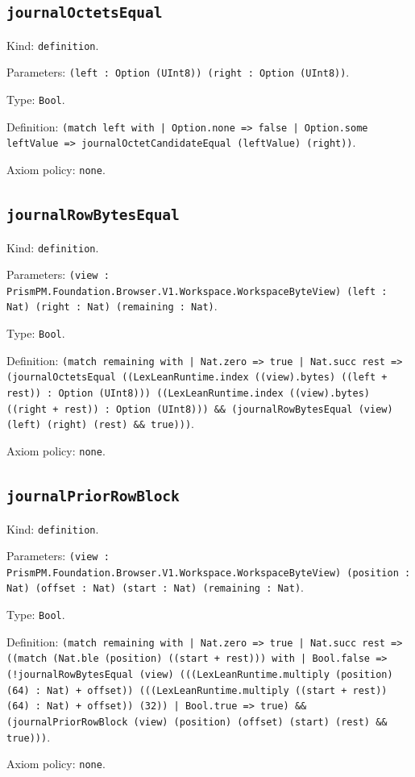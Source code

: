 \documentclass[11pt]{article}
\begin{document}
\subsection*{\texttt{journalOctetsEqual}}
\noindent Kind: \texttt{definition}.\par
\noindent Parameters: \texttt{(left : Option (UInt8)) (right : Option (UInt8))}.\par
\noindent Type: \texttt{Bool}.\par
\noindent Definition: \texttt{(match left with | Option.none => false | Option.some leftValue => journalOctetCandidateEqual (leftValue) (right))}.\par
\noindent Axiom policy: \texttt{none}.\par
\subsection*{\texttt{journalRowBytesEqual}}
\noindent Kind: \texttt{definition}.\par
\noindent Parameters: \texttt{(view : PrismPM.Foundation.Browser.V1.Workspace.WorkspaceByteView) (left : Nat) (right : Nat) (remaining : Nat)}.\par
\noindent Type: \texttt{Bool}.\par
\noindent Definition: \texttt{(match remaining with | Nat.zero => true | Nat.succ rest => (journalOctetsEqual ((LexLeanRuntime.index ((view).bytes) ((left + rest)) : Option (UInt8))) ((LexLeanRuntime.index ((view).bytes) ((right + rest)) : Option (UInt8))) \&\& (journalRowBytesEqual (view) (left) (right) (rest) \&\& true)))}.\par
\noindent Axiom policy: \texttt{none}.\par
\subsection*{\texttt{journalPriorRowBlock}}
\noindent Kind: \texttt{definition}.\par
\noindent Parameters: \texttt{(view : PrismPM.Foundation.Browser.V1.Workspace.WorkspaceByteView) (position : Nat) (offset : Nat) (start : Nat) (remaining : Nat)}.\par
\noindent Type: \texttt{Bool}.\par
\noindent Definition: \texttt{(match remaining with | Nat.zero => true | Nat.succ rest => ((match (Nat.ble (position) ((start + rest))) with | Bool.false => (!journalRowBytesEqual (view) (((LexLeanRuntime.multiply (position) (64) : Nat) + offset)) (((LexLeanRuntime.multiply ((start + rest)) (64) : Nat) + offset)) (32)) | Bool.true => true) \&\& (journalPriorRowBlock (view) (position) (offset) (start) (rest) \&\& true)))}.\par
\noindent Axiom policy: \texttt{none}.\par
\end{document}
